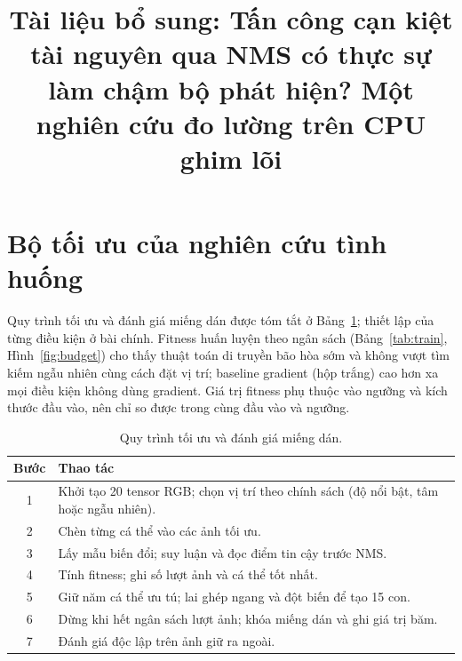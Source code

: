 \documentclass[11pt,a4paper]{article}
\title{Tài liệu bổ sung: Tấn công cạn kiệt tài nguyên qua NMS có thực sự làm chậm bộ phát hiện? Một nghiên cứu đo lường trên CPU ghim lõi}
\date{}
\begin{document}
\maketitle

\section{Bộ tối ưu của nghiên cứu tình huống}
Quy trình tối ưu và đánh giá miếng dán được tóm tắt ở Bảng~\ref{tab:algo}; thiết lập của từng điều kiện ở bài chính. Fitness huấn luyện theo ngân sách (Bảng~\ref{tab:train}, Hình~\ref{fig:budget}) cho thấy thuật toán di truyền bão hòa sớm và không vượt tìm kiếm ngẫu nhiên cùng cách đặt vị trí; baseline gradient (hộp trắng) cao hơn xa mọi điều kiện không dùng gradient. Giá trị fitness phụ thuộc vào ngưỡng và kích thước đầu vào, nên chỉ so được trong cùng đầu vào và ngưỡng.

\begin{table}[h]
\centering\small
\caption{Quy trình tối ưu và đánh giá miếng dán.}
\label{tab:algo}
\begin{tabular}{@{}cp{12.5cm}@{}}
\toprule
Bước & Thao tác \\
\midrule
1 & Khởi tạo 20 tensor RGB; chọn vị trí theo chính sách (độ nổi bật, tâm hoặc ngẫu nhiên). \\
2 & Chèn từng cá thể vào các ảnh tối ưu. \\
3 & Lấy mẫu biến đổi; suy luận và đọc điểm tin cậy trước NMS. \\
4 & Tính fitness; ghi số lượt ảnh và cá thể tốt nhất. \\
5 & Giữ năm cá thể ưu tú; lai ghép ngang và đột biến để tạo 15 con. \\
6 & Dừng khi hết ngân sách lượt ảnh; khóa miếng dán và ghi giá trị băm. \\
7 & Đánh giá độc lập trên ảnh giữ ra ngoài. \\
\bottomrule
\end{tabular}
\end{table}
\end{document}
